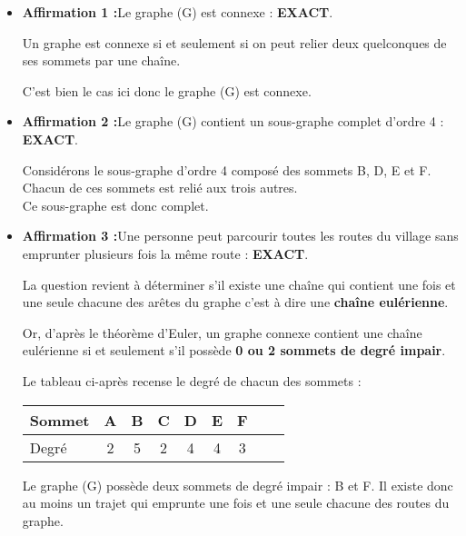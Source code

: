 \begin{corrige}
     \begin{itemize}
          \item %
          \textbf{Affirmation 1 :}\quad Le graphe (G) est connexe : \textbf{EXACT}.
          \par
          Un graphe est connexe si et seulement si on peut relier deux quelconques de ses sommets par une chaîne.
          \par
          C'est bien le cas ici donc le graphe (G) est connexe.
          \item %
          \textbf{Affirmation 2 :}\quad Le graphe (G) contient un sous-graphe complet d'ordre 4 : \textbf{EXACT}.
          \par
          Considérons le sous-graphe d'ordre 4 composé des sommets B, D, E et F. Chacun de ces sommets est relié aux trois autres.\\
          Ce sous-graphe est donc complet.
          \item %
          \textbf{Affirmation 3 :}\quad Une personne peut parcourir toutes les routes du village sans emprunter plusieurs fois la même route : \textbf{EXACT}.
          \par
          La question revient à déterminer s'il existe une chaîne qui contient une fois et une seule chacune des arêtes du graphe c'est à dire une \textbf{chaîne eulérienne}.
          \par
          Or, d'après le théorème d'Euler, un graphe connexe contient une chaîne eulérienne si et seulement s'il possède \textbf{0 ou 2 sommets de degré impair}.
          \par
          Le tableau ci-après recense le degré de chacun des sommets :
          \par
          \begin{center}
               \begin{tabular}{|l|c|c|c|c|c|c|c|c|}%
                    \hline
                    Sommet & A & B & C & D & E & F  \\
                    \hline
                    Degré & 2 & 5 & 2 & 4 & 4 & 3 \\
                    \hline
               \end{tabular}
          \end{center}
          \par
          Le graphe (G) possède deux sommets de degré impair : B et F. Il existe donc au moins un trajet qui emprunte une fois et une seule chacune des routes du graphe.\\

\end{itemize}
\end{corrige}
